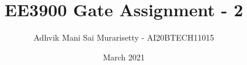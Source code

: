 \documentclass[journal,12pt,twocolumn]{IEEEtran}
\date{March 2021}
\DeclareMathOperator*{\Res}{Res}
\begin{document}
\newtheorem{theorem}{Theorem}[section]
\newtheorem{problem}{Problem}
\newtheorem{proposition}{Proposition}[section]
\newtheorem{lemma}{Lemma}[section]
\newtheorem{corollary}[theorem]{Corollary}
\newtheorem{example}{Example}[section]
\newtheorem{definition}[problem]{Definition}

\newcommand{\BEQA}{\begin{eqnarray}}
\newcommand{\EEQA}{\end{eqnarray}}
\newcommand{\define}{\stackrel{\triangle}{=}}

\raggedbottom
\setlength{\parindent}{0pt}
\providecommand{\mbf}{\mathbf}
\providecommand{\pr}[1]{\ensuremath{\Pr\left(#1\right)}}
\providecommand{\qfunc}[1]{\ensuremath{Q\left(#1\right)}}
\providecommand{\fn}[1]{\ensuremath{f\left({#1}\right)}}
\providecommand{\e}[1]{\ensuremath{E\left(#1\right)}}
\providecommand{\sbrak}[1]{\ensuremath{{}\left[#1\right]}}
\providecommand{\lsbrak}[1]{\ensuremath{{}\left[#1\right.}}
\providecommand{\rsbrak}[1]{\ensuremath{{}\left.#1\right]}}
\providecommand{\brak}[1]{\ensuremath{\left(#1\right)}}
\providecommand{\lbrak}[1]{\ensuremath{\left(#1\right.}}
\providecommand{\rbrak}[1]{\ensuremath{\left.#1\right)}}
\providecommand{\cbrak}[1]{\ensuremath{\left\{#1\right\}}}
\providecommand{\lcbrak}[1]{\ensuremath{\left\{#1\right.}}
\providecommand{\rcbrak}[1]{\ensuremath{\left.#1\right\}}}
\theoremstyle{remark}
\newtheorem{rem}{Remark}
\newcommand{\sgn}{\mathop{\mathrm{sgn}}}
\newcommand{\comb}[2]{{}^{#1}\mathrm{C}_{#2}}
\providecommand{\abs}[1]{\vert#1\vert}
\providecommand{\res}[1]{\Res\displaylimits_{#1}} 
\providecommand{\norm}[1]{\lVert#1\rVert}
\providecommand{\mtx}[1]{\mathbf{#1}}
\providecommand{\mean}[1]{E\sbrak{ #1 }}
\providecommand{\fourier}{\overset{\mathcal{F}}{ \rightleftharpoons}}
\providecommand{\system}{\overset{\mathcal{H}}{ \longleftrightarrow}}
\newcommand{\solution}{\noindent \textbf{Solution: }}
\newcommand{\cosec}{\,\text{cosec}\,}
\providecommand{\dec}[2]{\ensuremath{\overset{#1}{\underset{#2}{\gtrless}}}}
\newcommand{\myvec}[1]{\ensuremath{\begin{pmatrix}#1\end{pmatrix}}}
\newcommand{\mydet}[1]{\ensuremath{\begin{vmatrix}#1\end{vmatrix}}}
\makeatletter
{}
\makeatother
\let\StandardTheFigure\thefigure
\let\vec\mathbf
\vspace{3cm}
\title{EE3900 Gate Assignment - 2}
\author{Adhvik Mani Sai Murarisetty - AI20BTECH11015}
\maketitle
\newpage
\bigskip
\renewcommand{\thetable}{\theenumi}
\end{document}
